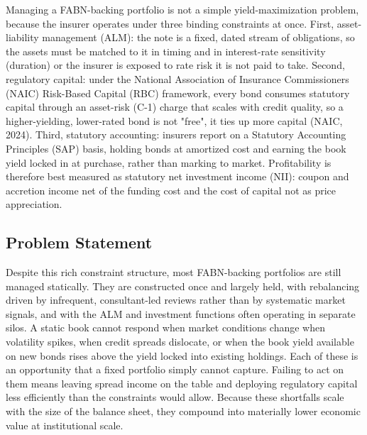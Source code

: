 \documentclass[12pt]{article}
\begin{document}
Managing a FABN-backing portfolio is not a simple yield-maximization problem, because the insurer operates under three binding constraints at once. First, asset-liability management (ALM): the note is a fixed, dated stream of obligations, so the assets must be matched to it in timing and in interest-rate sensitivity (duration) or the insurer is exposed to rate risk it is not paid to take. Second, regulatory capital: under the National Association of Insurance Commissioners (NAIC) Risk-Based Capital (RBC) framework, every bond consumes statutory capital through an asset-risk (C-1) charge that scales with credit quality, so a higher-yielding, lower-rated bond is not "free", it ties up more capital (NAIC, 2024). Third, statutory accounting: insurers report on a Statutory Accounting Principles (SAP) basis, holding bonds at amortized cost and earning the book yield locked in at purchase, rather than marking to market. Profitability is therefore best measured as statutory net investment income (NII): coupon and accretion income net of the funding cost and the cost of capital not as price appreciation.


\subsection{Problem Statement}

Despite this rich constraint structure, most FABN-backing portfolios are still managed statically. They are constructed once and largely held, with rebalancing driven by infrequent, consultant-led reviews rather than by systematic market signals, and with the ALM and investment functions often operating in separate silos. A static book cannot respond when market conditions change when volatility spikes, when credit spreads dislocate, or when the book yield available on new bonds rises above the yield locked into existing holdings. Each of these is an opportunity that a fixed portfolio simply cannot capture. Failing to act on them means leaving spread income on the table and deploying regulatory capital less efficiently than the constraints would allow. Because these shortfalls scale with the size of the balance sheet, they compound into materially lower economic value at institutional scale.
\end{document}
